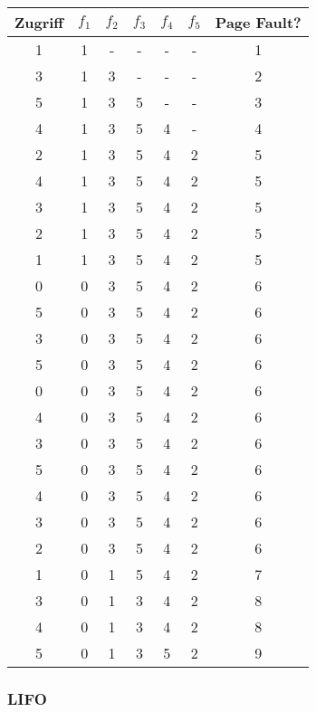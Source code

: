 \documentclass[10pt,a4paper]{article}
\begin{document}
\begin{tabular}{c|c|c|c|c|c|c}
  Zugriff & $f_{1}$ & $f_{2}$ & $f_{3}$ & $f_{4}$ & $f_{5}$ & Page Fault?\\\hline
  1 & 1 & - & - & - & - & 1\\
  3 & 1 & 3 & - & - & - & 2\\
  5 & 1 & 3 & 5 & - & - & 3\\
  4 & 1 & 3 & 5 & 4 & - & 4\\
  2 & 1 & 3 & 5 & 4 & 2 & 5\\
  4 & 1 & 3 & 5 & 4 & 2 & 5\\
  3 & 1 & 3 & 5 & 4 & 2 & 5\\
  2 & 1 & 3 & 5 & 4 & 2 & 5\\
  1 & 1 & 3 & 5 & 4 & 2 & 5\\
  0 & 0 & 3 & 5 & 4 & 2 & 6\\
  5 & 0 & 3 & 5 & 4 & 2 & 6\\
  3 & 0 & 3 & 5 & 4 & 2 & 6\\
  5 & 0 & 3 & 5 & 4 & 2 & 6\\
  0 & 0 & 3 & 5 & 4 & 2 & 6\\
  4 & 0 & 3 & 5 & 4 & 2 & 6\\
  3 & 0 & 3 & 5 & 4 & 2 & 6\\
  5 & 0 & 3 & 5 & 4 & 2 & 6\\
  4 & 0 & 3 & 5 & 4 & 2 & 6\\
  3 & 0 & 3 & 5 & 4 & 2 & 6\\
  2 & 0 & 3 & 5 & 4 & 2 & 6\\
  1 & 0 & 1 & 5 & 4 & 2 & 7\\
  3 & 0 & 1 & 3 & 4 & 2 & 8\\
  4 & 0 & 1 & 3 & 4 & 2 & 8\\
  5 & 0 & 1 & 3 & 5 & 2 & 9
\end{tabular}

\subsubsection*{LIFO}
\end{document}
